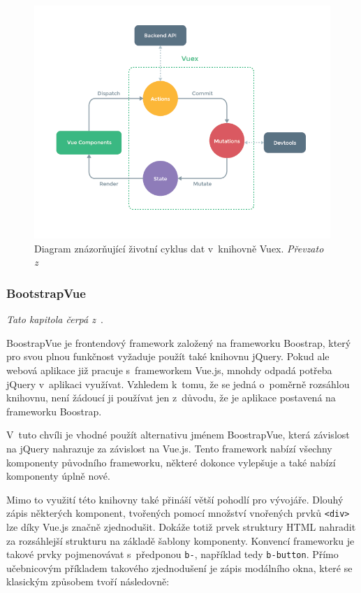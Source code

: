 \begin{figure}[H]
	\centering
	\includegraphics[width=\textwidth]{obrazky-figures/vuex.png}
	\caption{Diagram znázorňující životní cyklus dat v~knihovně Vuex. \emph{Převzato z~\cite{bib:vuex-doc}}}
	\label{img:vuex-dataflow}
\end{figure}

\blindtext


\subsubsection*{BootstrapVue}
\emph{Tato kapitola čerpá z~\cite{bib:bootstrap-vue}}.

BoostrapVue je frontendový framework založený na frameworku Boostrap, který pro svou plnou funkčnost vyžaduje použít také knihovnu jQuery. Pokud ale webová aplikace již pracuje s~frameworkem Vue.js, mnohdy odpadá potřeba jQuery v~aplikaci využívat. Vzhledem k~tomu, že se jedná o~poměrně rozsáhlou knihovnu, není žádoucí ji používat jen z~důvodu, že je aplikace postavená na frameworku Boostrap.

V~tuto chvíli je vhodné použít alternativu jménem BoostrapVue, která závislost na jQuery nahrazuje za závislost na Vue.js. Tento framework nabízí všechny komponenty původního frameworku, některé dokonce vylepšuje a také nabízí komponenty úplně nové.

Mimo to využití této knihovny také přináší větší pohodlí pro vývojáře. Dlouhý zápis některých komponent, tvořených pomocí množství vnořených prvků \texttt{<div>} lze díky Vue.js značně zjednodušit. Dokáže totiž prvek struktury HTML nahradit za rozsáhlejší strukturu na základě šablony komponenty. Konvencí frameworku je takové prvky pojmenovávat s~předponou \texttt{b-}, například tedy \texttt{b-button}.
Přímo učebnicovým příkladem takového zjednodušení je zápis modálního okna, které se klasickým způsobem tvoří následovně:

